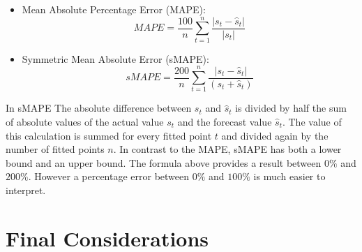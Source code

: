 \begin{itemize}	
	\item Mean Absolute Percentage Error (MAPE):
	\begin{equation}
	MAPE = \frac{100}{n}\sum_{t=1}^{n} \frac{\left|s_t - \hat{s}_t\right|}{|s_t|}
	\end{equation}	
	\item Symmetric Mean Absolute Error (sMAPE):	
	\begin{equation}
	sMAPE = \frac{200}{n}\sum_{t=1}^{n} \frac{\left|s_t - \hat{s}_t\right|}{\left(s_{t}+\hat{s}_{t}\right)}
	\end{equation}	
\end{itemize}
In sMAPE The absolute difference between $s_{t}$ and $\hat{s}_{t}$ is divided by half the sum of absolute values of the actual value $s_{t}$ and the forecast value $\hat{s}_{t}$. The value of this calculation is summed for every fitted point $t$ and divided again by the number of fitted points $n$. In contrast to the MAPE, sMAPE has both a lower bound and an upper bound. The formula above provides a result between $0\%$ and $200\%$. However a percentage error between $0\%$ and $100\%$ is much easier to interpret.  

\section{Final Considerations}
\label{Sec:TheoFinalConsiderations}

% 
